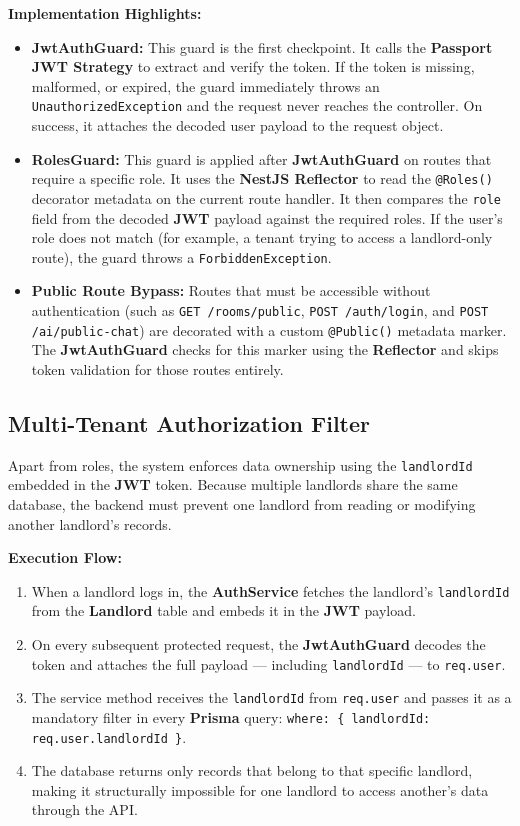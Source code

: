 \textbf{Implementation Highlights:}
\begin{itemize}
    \item \textbf{JwtAuthGuard:} This guard is the first checkpoint. It calls the \textbf{Passport JWT Strategy} to extract and verify the token. If the token is missing, malformed, or expired, the guard immediately throws an \texttt{UnauthorizedException} and the request never reaches the controller. On success, it attaches the decoded user payload to the request object.
    \item \textbf{RolesGuard:} This guard is applied after \textbf{JwtAuthGuard} on routes that require a specific role. It uses the \textbf{NestJS Reflector} to read the \texttt{@Roles()} decorator metadata on the current route handler. It then compares the \texttt{role} field from the decoded \textbf{JWT} payload against the required roles. If the user's role does not match (for example, a tenant trying to access a landlord-only route), the guard throws a \texttt{ForbiddenException}.
    \item \textbf{Public Route Bypass:} Routes that must be accessible without authentication (such as \texttt{GET /rooms/public}, \texttt{POST /auth/login}, and \texttt{POST /ai/public-chat}) are decorated with a custom \texttt{@Public()} metadata marker. The \textbf{JwtAuthGuard} checks for this marker using the \textbf{Reflector} and skips token validation for those routes entirely.
\end{itemize}

\subsection{Multi-Tenant Authorization Filter}

Apart from roles, the system enforces data ownership using the \texttt{landlordId} embedded in the \textbf{JWT} token. Because multiple landlords share the same database, the backend must prevent one landlord from reading or modifying another landlord's records.

\textbf{Execution Flow:}
\begin{enumerate}
    \item When a landlord logs in, the \textbf{AuthService} fetches the landlord's \texttt{landlordId} from the \textbf{Landlord} table and embeds it in the \textbf{JWT} payload.
    \item On every subsequent protected request, the \textbf{JwtAuthGuard} decodes the token and attaches the full payload — including \texttt{landlordId} — to \texttt{req.user}.
    \item The service method receives the \texttt{landlordId} from \texttt{req.user} and passes it as a mandatory filter in every \textbf{Prisma} query: \texttt{where: \{ landlordId: req.user.landlordId \}}.
    \item The database returns only records that belong to that specific landlord, making it structurally impossible for one landlord to access another's data through the API.
\end{enumerate}

